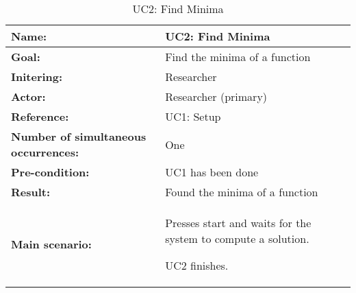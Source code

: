 \begin{table}[H]
	\begin{tabularx}{\textwidth}{| >{\raggedright\arraybackslash}p{3.3 cm} | >{\raggedright\arraybackslash}X |} \hline
		
		\textbf{Name:} 						& UC2: Find Minima\\ \hline
		\textbf{Goal:}						& Find the minima of a function \\ \hline
		\textbf{Initering:}					& Researcher \\ \hline
		\textbf{Actor:} 					& Researcher (primary) \\ \hline
		\textbf{Reference:} 				& UC1: Setup \\ \hline
		\textbf{Number of simultaneous occurrences:} & One \\ \hline
		\textbf{Pre-condition:} 				& UC1 has been done \\ \hline
		\textbf{Result:}					& Found the minima of a function \\ \hline
		\textbf{Main scenario:}				& 
		
		\begin{packed_enum}
			\item Presses start and waits for the system to compute a solution.
			\item UC2 finishes.
		\end{packed_enum} \\ \hline
	\end{tabularx}
\caption{UC2: Find Minima}
\label{tbl:uc2}
\end{table}